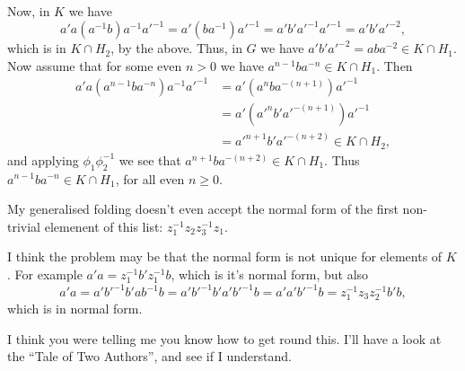 \documentclass[a4paper,12pt]{article}
\numberwithin{equation}{section}
\numberwithin{figure}{section}
\begin{document}
Now, in $K$ we have
\[
a'a (a^{-1}b) a^{-1}a'^{-1}= a'(ba^{-1})a'^{-1}= a'b'a'^{-1}a'^{-1}=a'b'a'^{-2},
\]
which is in $K\cap H_2$, by the above. Thus, in $G$ we have 
$a'b'a'^{-2}=aba^{-2}\in K\cap H_1$. Now assume that for some even $n>0$ we have
$a^{n-1}ba^{-n}\in K\cap H_1$. Then   
\begin{align*}
a'a(a^{n-1}ba^{-n})a^{-1}a'^{-1}&=a'(a^nba^{-(n+1)})a'^{-1}\\
&=a'(a'^nb'a'^{-(n+1)})a'^{-1}\\
&=a'^{n+1}b'a'^{-(n+2)}\in K\cap H_2,
\end{align*}
and applying $\phi_1\phi_2^{-1}$ we see that $a^{n+1}ba^{-(n+2)}\in K\cap H_1$. 
Thus $a^{n-1}ba^{-n}\in K\cap H_1$, for all even $n\ge 0$. 

My generalised folding doesn't even accept the normal form of the first non-trivial
elemenent of this list: $z_1^{-1}z_2z_3^{-1}z_1$.

I think the problem may be that the normal form is not unique
for elements of $K$. For example
$a'a = z_1^{-1} b' z_1^{-1}b$, which is it's normal form, but
also 
\[a'a=a'b'^{-1}b'ab^{-1}b=a'b'^{-1}b'a'b'^{-1}b=a'a'b'^{-1}b=
z_1^{-1}z_3z_2^{-1}b'b,\]
which is in normal form. 

I think you were telling me you know how to get round this. I'll have a
look at the ``Tale of Two Authors'', and see if I understand. 
\end{document}
